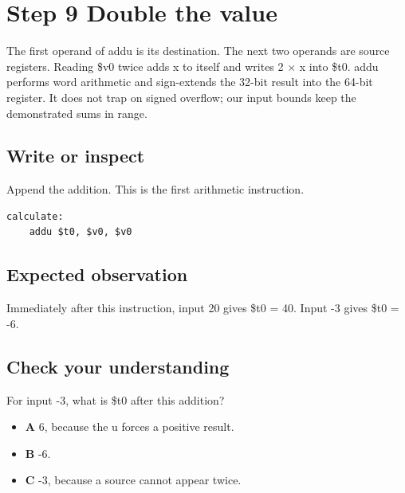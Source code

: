 \section{Step 9 Double the
  value}\label{001-console-calculation-s09-step-9-double-the-value}

The first operand of addu is its destination. The next two operands are
source registers. Reading \$v0 twice adds x to itself and writes 2 \ensuremath{\times} x
into \$t0. addu performs word arithmetic and sign-extends the 32-bit
result into the 64-bit register. It does not trap on signed overflow;
our input bounds keep the demonstrated sums in range.

\subsection{Write or
  inspect}\label{001-console-calculation-s09-write-or-inspect}

Append the addition. This is the first arithmetic instruction.

\begin{verbatim}
calculate:
    addu $t0, $v0, $v0
\end{verbatim}

\subsection{Expected
  observation}\label{001-console-calculation-s09-expected-observation}

Immediately after this instruction, input 20 gives \$t0 = 40. Input -3
gives \$t0 = -6.

\subsection{Check your
  understanding}\label{001-console-calculation-s09-check-your-understanding}

For input -3, what is \$t0 after this addition?

\begin{itemize}
  \tightlist
  \item
        \textbf{A} 6, because the u forces a positive result.
  \item
        \textbf{B} -6.
  \item
        \textbf{C} -3, because a source cannot appear twice.
\end{itemize}
